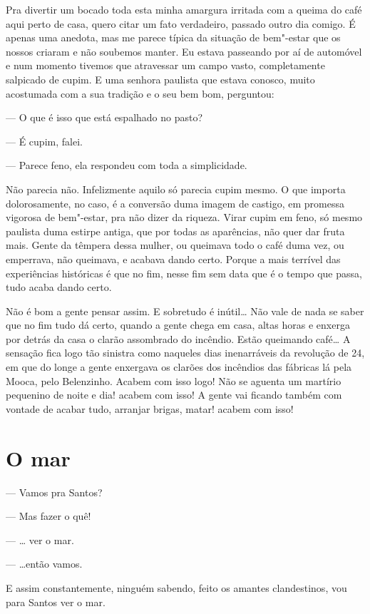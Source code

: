 Pra divertir um bocado toda esta minha amargura irritada com a queima do
café aqui perto de casa, quero citar um fato verdadeiro, passado outro
dia comigo. É apenas uma anedota, mas me parece típica da situação de
bem"-estar que os nossos criaram e não soubemos manter. Eu estava
passeando por aí de automóvel e num momento tivemos que atravessar um
campo vasto, completamente salpicado de cupim. E uma senhora paulista
que estava conosco, muito acostumada com a sua tradição e o seu bem bom,
perguntou:

--- O que é isso que está espalhado no pasto?

--- É cupim, falei.

--- Parece feno, ela respondeu com toda a simplicidade.

Não parecia não. Infelizmente aquilo só parecia cupim mesmo. O que
importa dolorosamente, no caso, é a conversão duma imagem de castigo, em
promessa vigorosa de bem"-estar, pra não dizer da riqueza. Virar cupim em
feno, só mesmo paulista duma estirpe antiga, que por todas as
aparências, não quer dar fruta mais. Gente da têmpera dessa mulher, ou
queimava todo o café duma vez, ou emperrava, não queimava, e acabava
dando certo. Porque a mais terrível das experiências históricas é que no
fim, nesse fim sem data que é o tempo que passa, tudo acaba dando certo.

Não é bom a gente pensar assim. E sobretudo é inútil\ldots{} Não vale de nada
se saber que no fim tudo dá certo, quando a gente chega em casa, altas
horas e enxerga por detrás da casa o clarão assombrado do incêndio.
Estão queimando café\ldots{} A sensação fica logo tão sinistra como naqueles
dias inenarráveis da revolução de 24, em que do longe a gente enxergava
os clarões dos incêndios das fábricas lá pela Mooca, pelo Belenzinho.
Acabem com isso logo! Não se aguenta um martírio pequenino de noite e
dia! acabem com isso! A gente vai ficando também com vontade de acabar
tudo, arranjar brigas, matar! acabem com isso!

\chapter{O mar}

--- Vamos pra Santos?

--- Mas fazer o quê!

--- \ldots{} ver o mar.

--- \ldots{}então vamos.

E assim constantemente, ninguém sabendo, feito os amantes clandestinos,
vou para Santos ver o mar.

